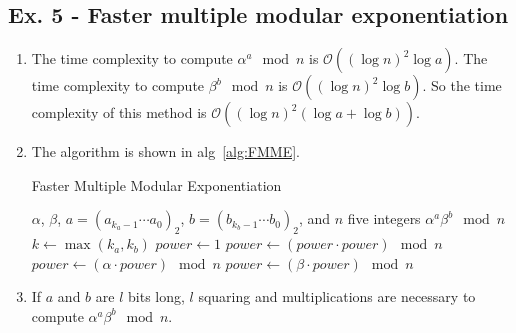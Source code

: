 \documentclass[11pt,a4paper]{article}
\begin{document}
\subsection*{Ex. 5 - Faster multiple modular exponentiation}
\begin{enumerate}
\item The time complexity to compute $\alpha^{a} \mod n$ is $\mathcal{O}\left((\log n)^{2}\log a\right)$. The time complexity to compute $\beta^{b} \mod n$ is $\mathcal{O}\left((\log n)^{2}\log b\right)$. So the time complexity of this method is $\mathcal{O}\left((\log n)^{2}(\log a + \log b)\right)$.

\item The algorithm is shown in alg~\ref{alg:FMME}.
	\begin{algorithm}[!ht]
		\caption{Faster Multiple Modular Exponentiation}
		\label{alg:FMME}
		\begin{algorithmic}[1]
			\Require $\alpha$, $\beta$, $a = (a_{k_{a}-1}\cdots a_{0})_{2}$, $b = (b_{k_{b}-1}\cdots b_{0})_{2}$, and $n$ five integers
			\Ensure $\alpha^{a}\beta^{b} \mod n$
			\State $k \leftarrow \max(k_{a}, k_{b})$
			\State $power \leftarrow 1$	
				\State $power \leftarrow (power\cdot power) \mod n$
					\State $power \leftarrow (\alpha \cdot power) \mod n$
				\EndIf
					\State $power \leftarrow (\beta \cdot power) \mod n$
				\EndIf
			\EndFor
			\State {}
		\end{algorithmic}
	\end{algorithm}
	
\item If $a$ and $b$ are $l$ bits long, $l$ squaring and multiplications are necessary to compute $\alpha^{a}\beta^{b} \mod n$.
\end{enumerate}
\end{document}
